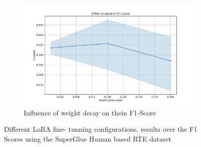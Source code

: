 \documentclass[fleqn,moreauthors,10pt]{ds_report}
\begin{document}
\begin{figure}[ht!]
\begin{subfigure}[b]{0.89\linewidth}
    \centering
    \includegraphics[width=\textwidth]{weight_decay_on_F1_Score.pdf}
    \caption{Influence of weight decay on thein F1-Score}
    \label{fig:image3}
\end{subfigure}

\caption{Different LoRA fine- tunning configurations, results over the F1 Scores using the SuperGlue Human based RTE dataset}
\label{fig:lora_params}
\end{figure}










\end{document}
